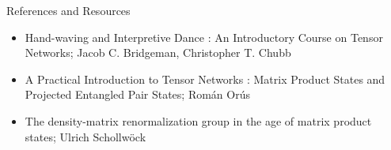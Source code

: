 \documentclass{beamer}
\begin{document}


%	


\begin{frame}{References and Resources}
	\begin{itemize}
	\item Hand-waving and Interpretive Dance : An Introductory Course on Tensor Networks; Jacob C. Bridgeman, Christopher T. Chubb
	\item A Practical Introduction to Tensor Networks : Matrix Product States and Projected Entangled Pair States; Rom\'an Or\'us
	\item The density-matrix renormalization group in the age of matrix product states; Ulrich Schollw\"ock
	\end{itemize}
\end{frame}
\end{document}
